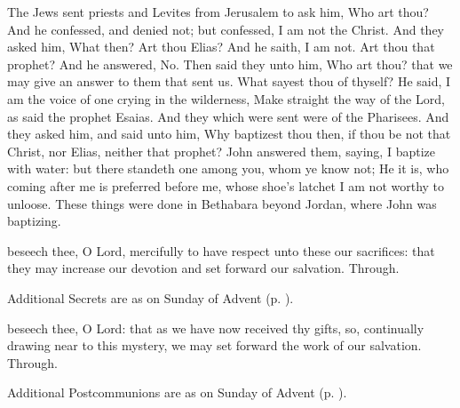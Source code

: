

 The Jews sent priests and Levites from Jerusalem to ask him, Who art thou? And he confessed, and denied not; but confessed, I am not the Christ. And they asked him, What then? Art thou Elias? And he saith, I am not. Art thou that prophet? And he answered, No. Then said they unto him, Who art thou? that we may give an answer to them that sent us. What sayest thou of thyself? He said, I am the voice of one crying in the wilderness, Make straight the way of the Lord, as said the prophet Esaias. And they which were sent were of the Pharisees. And they asked him, and said unto him, Why baptizest thou then, if thou be not that Christ, nor Elias, neither that prophet? John answered them, saying, I baptize with water: but there standeth one among you, whom ye know not; He it is, who coming after me is preferred before me, whose shoe's latchet I am not worthy to unloose. These things were done in Bethabara beyond Jordan, where John was baptizing.


\secret
{} beseech thee, O Lord, mercifully to have respect unto these our sacrifices: that they may increase our devotion and set forward our salvation. Through.
\begin{rubric}
    Additional Secrets are as on  Sunday of Advent (p. \pageref{AdventI}).
\end{rubric}

\postcommunion
{} beseech thee, O Lord: that as we have now received thy gifts, so, continually drawing near to this mystery, we may set forward the work of our salvation. Through.
\begin{rubric}
    Additional Postcommunions are as on  Sunday of Advent (p. \pageref{AdventI}).
\end{rubric}

